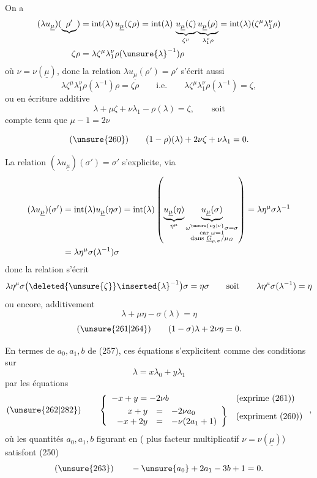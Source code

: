 On a\unsure{:}
\[
\begin{aligned}
(\lambda u_{\underline{\mu}})
(\underbrace{\rho'})
&=\operatorname{int}(\lambda)\,u_{\underline{\mu}}(\zeta\rho)
=\operatorname{int}(\lambda)\,
\underbrace{u_{\underline{\mu}}(\zeta)}_{\zeta^{\mu}}
\underbrace{u_{\underline{\mu}}(\rho)}_{\lambda_1^{\nu}\rho}
=\operatorname{int}(\lambda)(\zeta^{\mu}\lambda_1^{\nu}\rho)\\
\zeta\rho&=\lambda\zeta^{\mu}\lambda_1^{\nu}\rho(\unsure{\lambda}^{-1})\rho
\end{aligned}
\]
où $\nu=\nu(\underline{\mu})$, donc la relation
$\lambda u_{\underline{\mu}}(\rho')=\rho'$ s'écrit aussi
\[
\lambda\zeta^{\mu}\lambda_1^{\nu}\rho(\lambda^{-1})\rho
=\zeta\rho\qquad\text{i.e.}\qquad
\lambda\zeta^{\mu}\lambda_1^{\nu}\rho(\lambda^{-1})=\zeta,
\]
ou en écriture additive
\[
\lambda+\mu\zeta+\nu\lambda_1-\rho(\lambda)=\zeta,
\qquad\text{soit}
\]
compte tenu que $\mu-1=2\nu$



\[
(\unsure{260})\qquad(1-\rho)(\lambda)+2\nu\zeta+\nu\lambda_1=0.
\]

La relation $(\lambda u_{\underline{\mu}})(\sigma')=\sigma'$ s'explicite, via
\[
\begin{aligned}
(\lambda u_{\underline{\mu}})(\sigma')
&=\operatorname{int}(\lambda)u_{\underline{\mu}}(\eta\sigma)
=\operatorname{int}(\lambda)\left(
\underbrace{u_{\underline{\mu}}(\eta)}_{\eta^{\mu}}
\underbrace{u_{\underline{\mu}}(\sigma)}_{
\substack{\omega^{\unsure{\nu_2|\nu}}\sigma=\sigma\\
\text{car }\omega=1\\
\text{dans }\underline{G}_{\rho,\sigma}/\mu_G}}
\right)=\lambda\eta^{\mu}\sigma\lambda^{-1}\\
&=\lambda\eta^{\mu}\sigma(\lambda^{-1})\sigma
\end{aligned}
\]
donc la relation  s'écrit
\[
\lambda\eta^{\mu}\sigma\bigl(\deleted{\unsure{\zeta}}\inserted{\lambda}^{-1}\bigr)\sigma
=\eta\sigma\qquad\text{soit}\qquad
\lambda\eta^{\mu}\sigma(\lambda^{-1})=\eta
\]
ou encore, additivement
\[
\lambda+\mu\eta-\sigma(\lambda)=\eta
\]
\[
(\unsure{261|264})\qquad(1-\sigma)\lambda+2\nu\eta=0.
\]

En termes de $a_0,a_1,b$ de (257), ces équations s'explicitent comme des
conditions sur
\[
\lambda=x\lambda_0+y\lambda_1
\]
par les équations
\[
(\unsure{262|282})\qquad
\left\{
\begin{array}{ll}
-x+y=-2\nu b&\text{(exprime (261))}\\[3pt]
\left.\begin{array}{rcl}
x+y&=&-2\nu a_0\\
-x+2y&=&-\nu(2a_1+1)
\end{array}\right\}&\text{(expriment (260))}
\end{array}\right.,
\]
où les quantités $a_0,a_1,b$ figurant en 
( plus  facteur multiplicatif
$\nu=\nu(\underline{\mu})$) satisfont (250)
\[
(\unsure{263})\qquad-\unsure{a_0}+2a_1-3b+1=0.
\]

